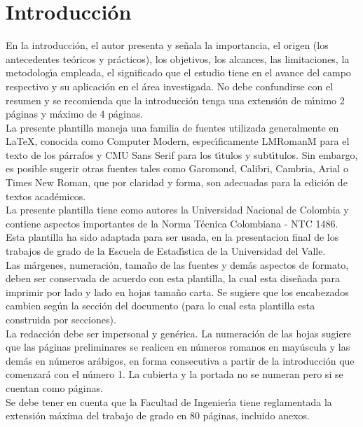 \chapter{Introducci\'{o}n}
En la introducci\'{o}n, el autor presenta y se\~{n}ala la importancia, el origen (los antecedentes te\'{o}ricos y pr\'{a}cticos), los objetivos, los alcances, las limitaciones, la metodolog\'{\i}a empleada, el significado que el estudio tiene en el avance del campo respectivo y su aplicaci\'{o}n en el \'{a}rea investigada. No debe confundirse con el resumen y se recomienda que la introducci\'{o}n tenga una extensi\'{o}n de m\'{\i}nimo 2 p\'{a}ginas y m\'{a}ximo de 4 p\'{a}ginas.\\

La presente plantilla maneja una familia de fuentes utilizada generalmente en LaTeX, conocida como Computer Modern, espec\'{\i}ficamente LMRomanM para el texto de los p\'{a}rrafos y CMU Sans Serif para los t\'{\i}tulos y subt\'{\i}tulos. Sin embargo, es posible sugerir otras fuentes tales como Garomond, Calibri, Cambria, Arial o Times New Roman, que por claridad y forma, son adecuadas para la edici\'{o}n de textos acad\'{e}micos.\\

La presente plantilla tiene como autores la Universidad Nacional de Colombia y contiene aspectos importantes de la Norma T\'{e}cnica Colombiana - NTC 1486. Esta plantilla ha sido adaptada para ser usada, en la presentacion final de los trabajos de grado de la Escuela de Estad\'{\i}stica de la Universidad del Valle.\\

Las m\'{a}rgenes, numeraci\'{o}n, tama\~{n}o de las fuentes y dem\'{a}s aspectos de formato, deben ser conservada de acuerdo con esta plantilla, la cual esta dise\~{n}ada para imprimir por lado y lado en hojas tama\~{n}o carta. Se sugiere que los encabezados cambien seg\'{u}n la secci\'{o}n del documento (para lo cual esta plantilla esta construida por secciones).\\

La redacci\'{o}n debe ser impersonal y gen\'{e}rica. La numeraci\'{o}n de las hojas sugiere que las p\'{a}ginas preliminares se realicen en n\'{u}meros romanos en may\'{u}scula y las dem\'{a}s en n\'{u}meros ar\'{a}bigos, en forma consecutiva a partir de la introducci\'{o}n que comenzar\'{a} con el n\'{u}mero 1. La cubierta y la portada no se numeran pero si se cuentan como p\'{a}ginas.\\

Se debe tener en cuenta que la Facultad de Ingenier\'{\i}a tiene reglamentada la extensi\'{o}n m\'{a}xima del trabajo de grado en 80 p\'{a}ginas, incluido anexos.\\

